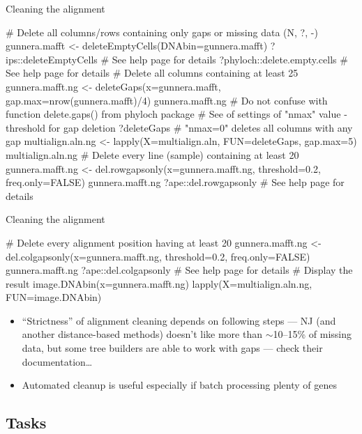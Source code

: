 \documentclass[compress, ucs, xelatex, 11pt, xcolor=svgnames, aspectratio=169,
	hyperref={
		bookmarks=true,
		unicode=true,
		colorlinks=true,
		pdftitle={Molecular data in R},
		plainpages=false,
		pdfauthor={Vojtech Zeisek},
		pdfsubject={Course about phylogeny and evolution in R},
		pdfcreator={XeLaTeX},
		pdfkeywords={R, evolution, phylogeny, molecular data},
		linkcolor=Crimson, %
		anchorcolor=Magenta, %
		citecolor=Magenta, %
		filecolor=Magenta, %
		menucolor=Magenta, %
		urlcolor=DodgerBlue, %
		pdftex},
	url={hyphens, lowtilde} %
	]{beamer}
\begin{document}
\begin{frame}[fragile]{Cleaning the alignment}
	\begin{spluscode}
    # Delete all columns/rows containing only gaps or missing data (N, ?, -)
    gunnera.mafft <- deleteEmptyCells(DNAbin=gunnera.mafft)
    ?ips::deleteEmptyCells # See help page for details
    ?phyloch::delete.empty.cells # See help page for details
    # Delete all columns containing at least 25%
    gunnera.mafft.ng <- deleteGaps(x=gunnera.mafft, gap.max=nrow(gunnera.mafft)/4)
    gunnera.mafft.ng
    # Do not confuse with function delete.gaps() from phyloch package
    # See of settings of "nmax" value - threshold for gap deletion
    ?deleteGaps # "nmax=0" deletes all columns with any gap
    multialign.aln.ng <- lapply(X=multialign.aln, FUN=deleteGaps, gap.max=5)
    multialign.aln.ng
    # Delete every line (sample) containing at least 20%
    gunnera.mafft.ng <- del.rowgapsonly(x=gunnera.mafft.ng, threshold=0.2,
      freq.only=FALSE)
    gunnera.mafft.ng
    ?ape::del.rowgapsonly # See help page for details
	\end{spluscode}
\end{frame}

\begin{frame}[fragile]{Cleaning the alignment}
	\begin{spluscode}
    # Delete every alignment position having at least 20%
    gunnera.mafft.ng <- del.colgapsonly(x=gunnera.mafft.ng, threshold=0.2,
      freq.only=FALSE)
    gunnera.mafft.ng
    ?ape::del.colgapsonly # See help page for details
    # Display the result
    image.DNAbin(x=gunnera.mafft.ng)
    lapply(X=multialign.aln.ng, FUN=image.DNAbin)
	\end{spluscode}
	\vfil
	\begin{itemize}
		\item \enquote{Strictness} of alignment cleaning depends on following steps --- NJ (and another distance-based methods) doesn't like more than $\sim$10--15\% of missing data, but some tree builders are able to work with gaps --- check their documentation\ldots
		\item Automated cleanup is useful especially if batch processing plenty of genes
	\end{itemize}
\end{frame}

\subsection{Tasks}
\end{document}
